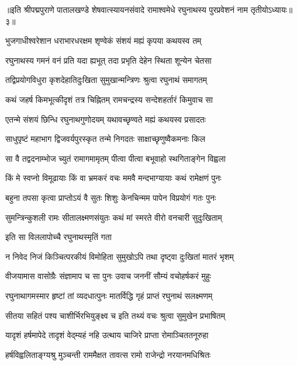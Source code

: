 ॥इति श्रीपद्मपुराणे पातालखण्डे शेषवात्स्यायनसंवादे रामाश्वमेधे रघुनाथस्य पुरप्रवेशनं नाम तृतीयोऽध्यायः॥३॥



\twolineshloka
{भुजगाधीश्वरेशान धराभारधरक्षम}
{शृण्वेकं संशयं मह्यं कृपया कथयस्व तम्}%

\twolineshloka
{रघुनाथस्य गमनं वनं प्रति यदा ह्यभूत्}
{तदा प्रभृति देहेन स्थिता शून्येन चेतसा}%

\twolineshloka
{तद्विप्रयोगविधुरा कृशदेहातिदुःखिता}
{सुमुखान्मन्त्रिणः श्रुत्वा रघुनाथं समागतम्}%

\twolineshloka
{कथं जहर्ष किमभूत्कीदृशं तत्र चिह्नितम्}
{रामचन्द्रस्य सन्देशहर्तारं किमुवाच सा}%

\twolineshloka
{एतन्मे संशयं छिन्धि रघुनाथगुणोदयम्}
{यथावच्छृण्वते मह्यं कथयस्व प्रसादतः}%


\twolineshloka
{साधुपृष्टं महाभाग द्विजवर्यपुरस्कृत}
{तन्मे निगदतः साक्षाच्छृणुष्वैकमनाः किल}%

\twolineshloka
{सा वै तद्वदनाम्भोज च्युतं रामागमामृतम्}
{पीत्वा पीत्वा बभूवाहो स्थगिताङ्गेन विह्वला}%

\twolineshloka
{किं मे स्वप्नो विमूढायाः किं वा भ्रमकरं वचः}
{ममवै मन्दभाग्यायाः कथं रामेक्षणं पुनः}%

\twolineshloka
{बहुना तपसा कृत्वा प्राप्तोऽयं वै सुतः शिशुः}
{केनचिन्मम पापेन विप्रयोगं गतः पुनः}%

\twolineshloka
{सुमन्त्रिन्कुशली रामः सीतालक्ष्मणसंयुतः}
{कथं मां स्मरते वीरो वनचारी सुदुःखिताम्}%

इति सा विललापोच्चै रघुनाथस्मृतिं गता

\twolineshloka
{न निवेद निजं किञ्चित्परकीयं विमोहिता}
{सुमुखोऽपि तथा दृष्ट्वा दुःखितां मातरं भृशम्}%

\twolineshloka
{वीजयामास वासोग्रैः संज्ञामाप च सा पुनः}
{उवाच जननीं सौम्यं वचोहर्षकरं मुहुः}%

\twolineshloka
{रघुनाथागमस्मार हृष्टां तां व्यदधात्पुनः}
{मातर्विद्धि गृहं प्राप्तं रघुनाथं सलक्ष्मणम्}%

\twolineshloka
{सीतया सहितं पश्य चाशीर्भिरभियुङ्क्ष्व च}
{इति तथ्यं वचः श्रुत्वा सुमुखेन प्रभाषितम्}%

\twolineshloka
{यादृशं हर्षमापेदे तादृशं वेद्म्यहं नहि}
{उत्थाय चाजिरे प्राप्ता रोमाञ्चिततनूरुहा}%

\twolineshloka
{हर्षविह्वलिताङ्ग्यश्रु मुञ्चन्ती राममैक्षत}
{तावत्स रामो राजेन्द्रो नरयानमधिश्रितः}%

